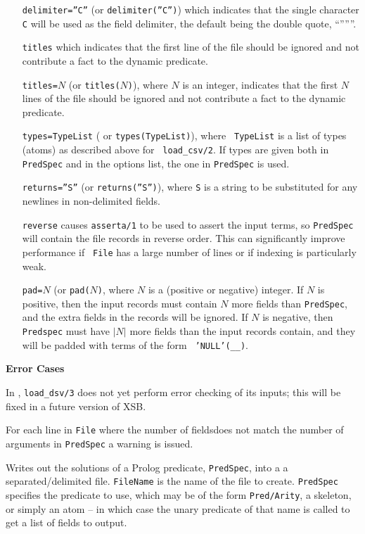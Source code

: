 \begin{description}
\begin{itemize}
  {\tt Example: } To load a tab-separated file (tsv) use 
    \verb|separator="\t"| in the options list.
\item[{\tt delimiter=''C''}] (or {\tt delimiter(''C'')}) which
  indicates that the single character {\tt C} will be used as the
  field delimiter, the default being the double quote, ``''''''.
\item[{\tt titles}] which indicates that the first line of the file should
  be ignored and not contribute a fact to the dynamic predicate.
\item[{\tt titles=$N$}] (or {\tt titles($N$)}), where $N$ is an integer,
  indicates that the first $N$ lines of the file should be ignored and
  not contribute a fact to the dynamic predicate.
\item[{\tt types=TypeList}] ( or {\tt types(TypeList)}), where {\tt
  TypeList} is a list of types (atoms) as described above for {\tt
  load\_csv/2}.  If types are given both in {\tt PredSpec} and in the
  options list, the one in {\tt PredSpec} is used.
\item[{\tt returns=''S''}] (or {\tt returns(''S'')}), where {\tt S} is
  a string to be substituted for any newlines in non-delimited fields.
\item[{\tt reverse}] causes {\tt asserta/1} to be used to assert the
  input terms, so {\tt PredSpec} will contain the file records in
  reverse order.  This can significantly improve performance if {\tt
    File} has a large number of lines or if indexing is particularly
  weak.
\item[{\tt pad=$N$}] (or {\tt pad($N$)}, where $N$ is a (positive or
  negative) integer.  If $N$ is positive, then the input records must
  contain $N$ more fields than {\tt PredSpec}, and the extra fields in
  the records will be ignored.  If $N$ is negative, then {\tt
    Predspec} must have $|N|$ more fields than the input records
  contain, and they will be padded with terms of the form {\tt
    'NULL'(\_\_)}.
\end{itemize}

{\bf Error Cases} 

In \version{}, {\tt load\_dsv/3} does not yet perform error checking of its
inputs; this will be fixed in a future version of XSB.

For each line in {\tt File} where the number of fieldsdoes not match
the number of arguments in {\tt PredSpec} a warning is issued.

Writes out the solutions of a Prolog predicate, {\tt PredSpec}, into a
a separated/delimited file.  {\tt FileName} is the name of the file to
create.  {\tt PredSpec} specifies the predicate to use, which may be
of the form {\tt Pred/Arity}, a skeleton, or simply an atom -- in
which case the unary predicate of that name is called to get a list of
fields to output.


\end{description}
